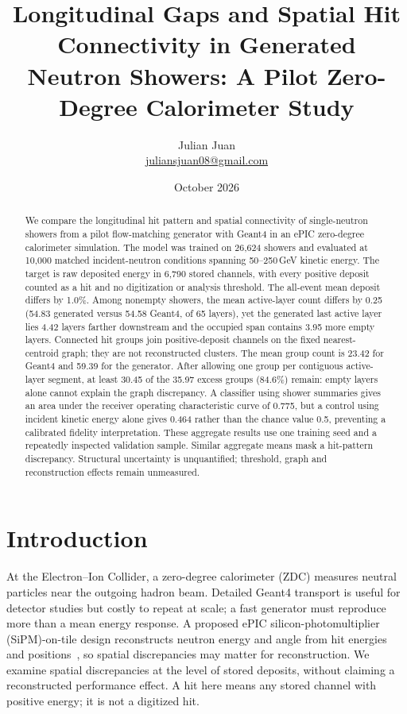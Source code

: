 \documentclass[10pt]{article}
\title{Longitudinal Gaps and Spatial Hit Connectivity in Generated\\Neutron Showers: A Pilot Zero-Degree Calorimeter Study}
\author{Julian Juan\\[3pt]\small\href{mailto:juliansjuan08@gmail.com}{juliansjuan08@gmail.com}}
\date{October 2026}
\begin{document}
\maketitle

\begin{abstract}
We compare the longitudinal hit pattern and spatial connectivity of single-neutron showers from a pilot flow-matching generator with Geant4 in an ePIC zero-degree calorimeter simulation. The model was trained on 26,624 showers and evaluated at 10,000 matched incident-neutron conditions spanning 50--250\,GeV kinetic energy. The target is raw deposited energy in 6,790 stored channels, with every positive deposit counted as a hit and no digitization or analysis threshold. The all-event mean deposit differs by 1.0\%. Among nonempty showers, the mean active-layer count differs by 0.25 (54.83 generated versus 54.58 Geant4, of 65 layers), yet the generated last active layer lies 4.42 layers farther downstream and the occupied span contains 3.95 more empty layers. Connected hit groups join positive-deposit channels on the fixed nearest-centroid graph; they are not reconstructed clusters. The mean group count is 23.42 for Geant4 and 59.39 for the generator. After allowing one group per contiguous active-layer segment, at least 30.45 of the 35.97 excess groups (84.6\%) remain: empty layers alone cannot explain the graph discrepancy. A classifier using shower summaries gives an area under the receiver operating characteristic curve of 0.775, but a control using incident kinetic energy alone gives 0.464 rather than the chance value 0.5, preventing a calibrated fidelity interpretation. These aggregate results use one training seed and a repeatedly inspected validation sample. Similar aggregate means mask a hit-pattern discrepancy. Structural uncertainty is unquantified; threshold, graph and reconstruction effects remain unmeasured.
\end{abstract}

\section{Introduction}

At the Electron--Ion Collider, a zero-degree calorimeter (ZDC) measures neutral particles near the outgoing hadron beam. Detailed Geant4 transport is useful for detector studies but costly to repeat at scale; a fast generator must reproduce more than a mean energy response. A proposed ePIC silicon-photomultiplier (SiPM)-on-tile design reconstructs neutron energy and angle from hit energies and positions~\cite{epiczdc}, so spatial discrepancies may matter for reconstruction. We examine spatial discrepancies at the level of stored deposits, without claiming a reconstructed performance effect. A hit here means any stored channel with positive energy; it is not a digitized hit.
\end{document}
